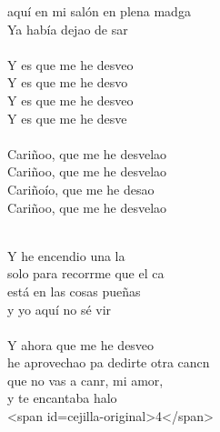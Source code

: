 \begin{cancion}[titulo=Desvelao, autor=Serko, cejilla=4]
\begin{chorus}
	aquí en mi salón en plena madga\\
	Ya había dejao de sar\\
\jump\\
	Y es que me he desveo\\
	Y es que me he desvo\\
	Y es que me he desveo \\
	Y es que me he desve\\
\jump\\
	Cariñoo, que me he desvelao \\
	Cariñoo, que me he desvelao \\
	Cariñoío, que me he desao\\
	Cariñoo, que me he desvelao \\
	\end{chorus}%
	\jump\\
	Y he encendio una la \\
	solo para recorrme que el ca\\
	está en las cosas pueñas \\
	y yo aquí no sé vir \\
\jump\\
	Y ahora que me he desveo \\
	he aprovechao pa dedirte otra cancn\\
	que no vas a canr, mi amor,\\
	y te encantaba halo      \\
<span id=cejilla-original>4</span>\\
\end{cancion}%
